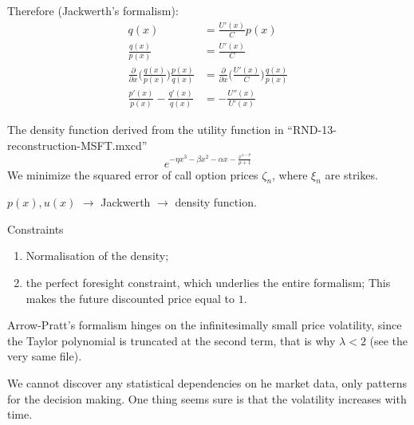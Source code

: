 \documentclass[a4paper]{article}
\begin{document}
Therefore (Jackwerth's formalism):
\begin{align*}
	q(x) &= \frac{U'(x)}{C}p(x)\\
	\frac{q(x)}{p(x)} &= \frac{U'(x)}{C}\\
	\frac{\partial}{\partial x}\Big(\frac{q(x)}{p(x)}\Big)\frac{p(x)}{q(x)} &= \frac{\partial}{\partial x}\Big(\frac{U'(x)}{C}\Big) \frac{q(x)}{p(x)}\\
	\frac{p'(x)}{p(x)} - \frac{q'(x)}{q(x)} &= - \frac{U''(x)}{U'(x)}
\end{align*}

The density function derived from the utility function in ``RND-13-reconstruction-MSFT.mxcd''
\[e^{-\eta x^3 - \beta x^2 - \alpha x - \frac{x^{1-\theta}}{\rho+1} }\]
We minimize the squared error of call option prices $\zeta_n$, where $\xi_n$ are strikes.

$p(x), u(x)$ $\to$ Jackwerth $\to$ density function.

Constraints \begin{enumerate}
	\item Normalisation of the density;
	\item the perfect foresight constraint, which underlies the entire formalism; This makes the future discounted price equal to $1$.
\end{enumerate}

Arrow-Pratt's formalism hinges on the infinitesimally small price volatility, since the Taylor polynomial is truncated at the second term, that is why $\lambda<2$ (see the very same file).


We cannot discover any statistical dependencies on he market data, only patterns for the decision making. One thing seems sure is that the volatility increases with time.




\end{document}

